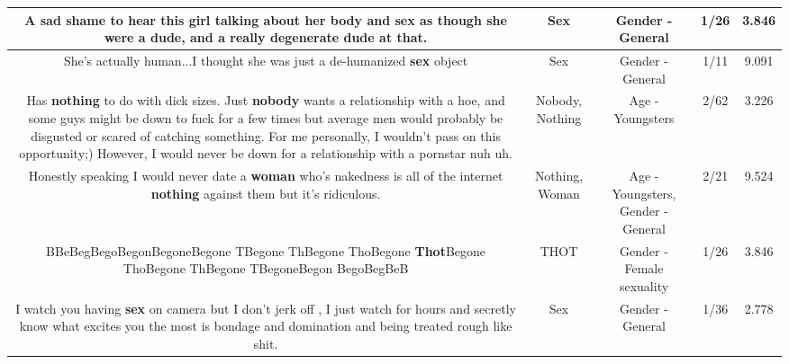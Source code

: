 \documentclass[11pt]{article}
\newlength\mylength
\begin{document}
\begin{center}
\begin{longtable}{|C{.65\mylength}|C{.30\mylength}|C{.12\mylength}|C{.12\mylength}|C{.12\mylength}|}
  \small A sad shame to hear this girl talking about her body and \textbf{sex} as though she were a dude, and a really degenerate dude at that.\normalsize   & Sex & Gender - General & 1/26 & 3.846 \\  \hline
  \small She's actually human...I thought she was just a de-humanized \textbf{sex} object\normalsize   & Sex & Gender - General & 1/11 & 9.091 \\  \hline
  \small Has \textbf{nothing} to do with dick sizes. Just \textbf{nobody} wants a relationship with a hoe, and some guys might be down to fuck for a few times but average men would probably be disgusted or scared of catching something. For me personally, I wouldn't pass on this opportunity;) However, I would never be down for a relationship with a pornstar nuh uh.\normalsize   & Nobody, Nothing & Age - Youngsters & 2/62 & 3.226 \\  \hline
  \small Honestly speaking I would never date a \textbf{woman} who's nakedness is all of the internet \textbf{nothing} against them but it's ridiculous.\normalsize   & Nothing, Woman & Age - Youngsters, Gender - General & 2/21 & 9.524 \\  \hline
  \small BBeBegBegoBegonBegoneBegone TBegone ThBegone ThoBegone \textbf{Thot}Begone ThoBegone ThBegone TBegoneBegon BegoBegBeB\normalsize   & THOT & Gender - Female sexuality & 1/26 & 3.846 \\  \hline
  \small I watch you having \textbf{sex} on camera but I don't jerk off , I just watch for hours and secretly know what excites you the most is bondage and domination and being treated rough like shit.\normalsize   & Sex & Gender - General & 1/36 & 2.778 \\  \hline

\end{longtable}
\end{center}
\end{document}
